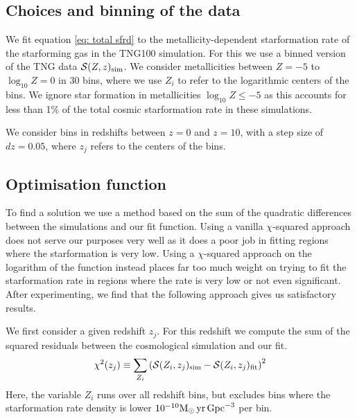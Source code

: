 \documentclass[twocolumn]{aastex631}
\newcommand{\Msun}{\ensuremath{\rm{M}_{\odot}}\xspace}
\newcommand{\yr}{\ensuremath{\,\rm{yr}}\xspace}
\newcommand{\Mpc}{\ensuremath{\,\rm{Gpc}}\xspace}
\newcommand{\SFRDzZ}{\ensuremath{\mathcal{S}(Z,z)}\xspace}
\begin{document}
\subsection{Choices and binning of the data}
We fit equation \ref{eq: total sfrd} to the metallicity-dependent starformation rate of the starforming gas in the TNG100 simulation. For this we use a binned version of the TNG data $\SFRDzZ_{\rm sim}$. We consider metallicities between $Z= -5$ to $\log_{10} Z= 0$ in 30 bins, where we use $Z_i$ to refer to the logarithmic centers of the bins. We ignore star formation in metallicities $\log_{10} Z \le -5$ as this accounts for less than 1\% of the total cosmic starformation rate in these simulations.  

We consider bins in redshifts between $z=0$ and $z=10$, with a step size of $dz=0.05$, where $z_j$ refers to the centers of the bins. 

\subsection{Optimisation function}
To find a solution we use a method based on the sum of the quadratic differences between the simulations and our fit function. Using a vanilla $\chi$-squared approach does not serve our purposes very well as it does a poor job in fitting regions where the starformation is very low.  Using a $\chi$-squared approach on the logarithm of the function instead places far too much weight on trying to fit the starformation rate in regions where the rate is very low or not even significant.  After experimenting, we find that the following approach gives us satisfactory results. 

We first consider a given redshift $z_j$.  For this redshift we compute the sum of the squared residuals between the cosmological simulation and our fit.  
%
\begin{equation}
\label{eq: chisquare}
    \chi^2 (z_j) \equiv \sum_{Z_i} \left( 
        \mathcal{S}(Z_i,z_j)_{\rm sim} - 
        \mathcal{S}(Z_i,z_j)_{\rm fit}\right)^2
\end{equation}
%
Here, the variable $Z_i$ runs over all redshift bins, but excludes bins where the starformation rate density is lower $10^{-10} \Msun \yr \Mpc^{-3}$ per bin. 
\end{document}
